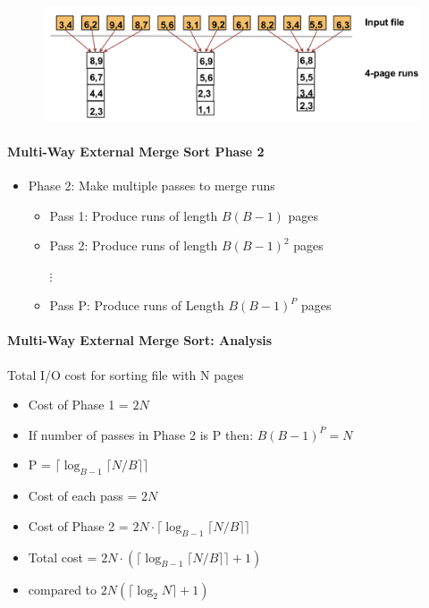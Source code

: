 \begin{figure}[h]
  \begin{minipage}{1.0\linewidth}
    \begin{center}
      \includegraphics[scale=0.18]{graphics/B=4}
    \end{center}
  \end{minipage}
\end{figure}



\paragraph{Multi-Way External Merge Sort Phase 2}
\begin{itemize}
\item Phase 2: Make multiple passes to merge runs
  \begin{itemize}
  \item Pass 1: Produce runs of length $B(B-1)$ pages
  \item Pass 2: Produce runs of length $B(B-1)^2$ pages

    $\vdots$

  \item Pass P: Produce runs of Length $B(B-1)^P$ pages
  \end{itemize}
\end{itemize}

\paragraph{Multi-Way External Merge Sort: Analysis}
Total I/O cost for sorting file with N pages

\begin{itemize}
\item Cost of Phase 1 = $2N$
\item If number of passes in Phase 2 is P then: $B(B-1)^P = N$
\item P = $\lceil \log_{B-1}\lceil N/B \rceil\rceil$
\item Cost of each pass = $2N$
\item Cost of Phase 2 =
  $2N \cdot \lceil \log_{B-1} \lceil N / B\rceil \rceil$
\item Total cost =
    $2N \cdot (\lceil \log_{B-1} \lceil N / B\rceil \rceil + 1)$
\item compared to $2N (\lceil \log_2 N \rceil + 1)$
\end{itemize}

